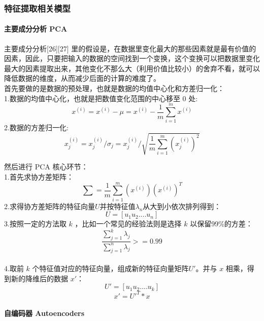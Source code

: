\subsubsection{特征提取相关模型}\label{ux7279ux5f81ux63d0ux53d6ux76f8ux5173ux6a21ux578b}

\paragraph{主要成分分析
PCA}\label{ux4e3bux8981ux6210ux5206ux5206ux6790-pca}

主要成分分析{[}26{]}{[}27{]}
里的假设是，在数据里变化最大的那些因素就是最有价值的因素，因此，只要把输入的数据的空间找到一个变换，这个变换可以把数据里变化最大的因素提取出来，其他变化不那么大（利用价值比较小）的舍弃不看，就可以降低数据的维度，从而减少后面的计算的难度了。\\首先要做的是数据的预处理，也就是数据的均值中心化和方差归一化：\\1.数据的均值中心化，也就是把数值变化范围的中心移至
0
处:\\\[ x^{(i)} = x^{(i)} - \mu = x^{(i)} - \frac{1}{m} \sum_{i=1}^m {x^{(i)}}\]
2.数据的方差归一化:\\\[ x_j^{(i)} = x_j^{(i)} / \sigma_j = x_j^{(i)} / \sqrt{\frac{1}{m} \sum_{i=1}^m {(x_{j}^{(i)})^2}} \]

然后进行 PCA 核心环节：\\1.首先求协方差矩阵：
\[\sum = \frac{1}{m} \sum_{i=1}^{m}(x^{(i)})(x^{(i)})^T\]
2.求得协方差矩阵的特征向量\(U\)并按特征值\(\lambda_n\)从大到小依次排列得到：\\\[U=[u_1 u_2 .... u_n]\]
3.按照一定的方法取 \(k\) ，比如一个常见的经验法则是选择 \(k\)
以保留99\%的方差：
\[\frac{\sum^{k}_{j=1}\lambda_j}{\sum^{n}_{j=1}\lambda_j} >= 0.99\]\\4.取前
\(k\) 个特征值对应的特征向量，组成新的特征向量矩阵\(U'\)。并与 \(x\)
相乘，得到新的降维后的数据 \(x'\)：\\\[U' = [u_1 u_2 .... u_k]\]
\[x' = U'^T * x\]

\paragraph{自编码器
Autoencoders}\label{ux81eaux7f16ux7801ux5668-autoencoders}

